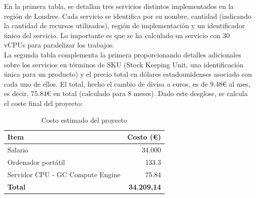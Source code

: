 En la primera tabla, se detallan tres servicios distintos implementados en la región de Londres. Cada servicio se identifica por su nombre, cantidad (indicando la cantidad de recursos utilizados), región de implementación y un identificador único del servicio. Lo importante es que se ha calculado un servicio con $30$ vCPUs para paralelizar los trabajos.\\[6pt]

La segunda tabla complementa la primera proporcionando detalles adicionales sobre los servicios en términos de SKU (Stock Keeping Unit, una identificación única para un producto) y el precio total en dólares estadounidenses asociado con cada uno de ellos. El total, hecho el cambio de divisa a euros, es de $9.48$€ al mes, es decir, $75.84$€ en total (calculado para 8 meses).
Dado este desglose, se calcula el coste final del proyecto:
\begin{table}[h]
      \centering
      \begin{tabular}{|l|r|}
            \hline
            \textbf{Item}                    & \textbf{Costo (€)} \\ \hline
            Salario                          & 34.000             \\
            Ordenador portátil               & 133.3              \\
            Servidor CPU - GC Compute Engine & 75.84              \\
            \textbf{Total}                   & \textbf{34.209,14} \\ \hline
      \end{tabular}
      \caption{Costo estimado del proyecto}
      \label{tab:proyect_budget}
\end{table}